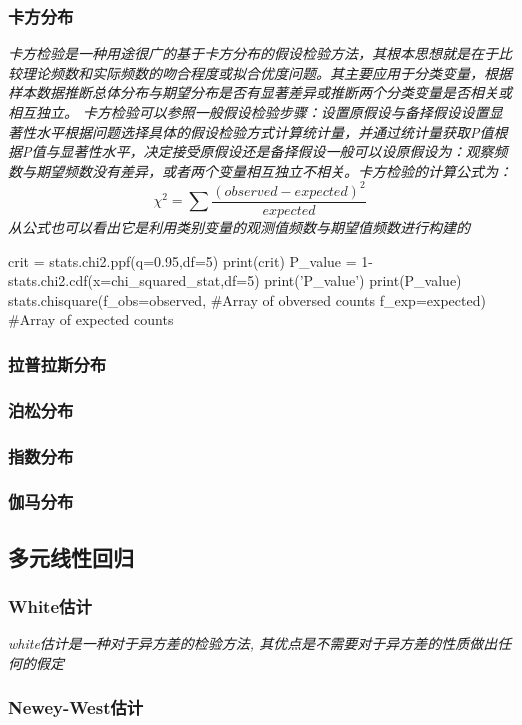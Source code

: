 \documentclass{scrartcl}
\numberwithin{equation}{section}
\begin{document}
\subsubsection{卡方分布}
\textsl{卡方检验是一种用途很广的基于卡方分布的假设检验方法，其根本思想就是在于比较理论频数和实际频数的吻合程度或拟合优度问题。其主要应用于分类变量，根据样本数据推断总体分布与期望分布是否有显著差异或推断两个分类变量是否相关或相互独立。}
\textsl{
    卡方检验可以参照一般假设检验步骤：设置原假设与备择假设设置显著性水平根据问题选择具体的假设检验方式计算统计量，并通过统计量获取P值根据P值与显著性水平，决定接受原假设还是备择假设一般可以设原假设为：观察频数与期望频数没有差异，或者两个变量相互独立不相关。卡方检验的计算公式为： $$\chi^2 = \sum \frac{(observed - expected)^2}{expected}$$从公式也可以看出它是利用类别变量的观测值频数与期望值频数进行构建的
}

\begin{python}
crit = stats.chi2.ppf(q=0.95,df=5)
print(crit)
P_value = 1-stats.chi2.cdf(x=chi_squared_stat,df=5)
print('P_value')
print(P_value) 
stats.chisquare(f_obs=observed, #Array of obversed counts
                f_exp=expected) #Array of expected counts
\end{python}

\subsubsection{拉普拉斯分布}
\subsubsection{泊松分布}
\subsubsection{指数分布}
\subsubsection{伽马分布}
\subsection{多元线性回归}

\subsubsection{White估计}
\textsl{white估计是一种对于异方差的检验方法, 其优点是不需要对于异方差的性质做出任何的假定}
\subsubsection{Newey-West估计}
\end{document}
